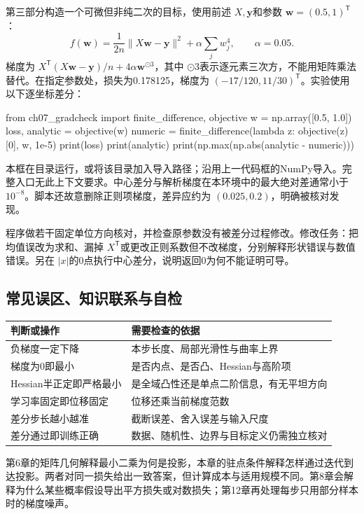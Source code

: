 \documentclass[UTF8,fontset=none,zihao=-4,a4paper]{ctexart}
\newcommand{\code}[1]{\texttt{\detokenize{#1}}}
\numberwithin{equation}{section}
\numberwithin{figure}{section}
\begin{document}
第三部分构造一个可微但非纯二次的目标，使用前述 $X,\symbf y$和参数 $\symbf w=(0.5,1)^{\mathsf T}$：
\[
 f(\symbf w)=\frac1{2n}\|X\symbf w-\symbf y\|^2+\alpha\sum_jw_j^4,
 \qquad \alpha=0.05.
\]
梯度为 $X^{\mathsf T}(X\symbf w-\symbf y)/n+4\alpha\symbf w^{\odot3}$，其中 $\odot3$表示逐元素三次方，不能用矩阵乘法替代。在指定参数处，损失为0.178125，梯度为 $(-17/120,11/30)^{\mathsf T}$。实验使用以下逐坐标差分：
\begin{pycode}
from ch07_gradcheck import finite_difference, objective
w = np.array([0.5, 1.0])
loss, analytic = objective(w)
numeric = finite_difference(lambda z: objective(z)[0], w, 1e-5)
print(loss)
print(analytic)
print(np.max(np.abs(analytic - numeric)))
\end{pycode}
本框在\code{配套实验}目录运行，或将该目录加入导入路径；\code{np}沿用上一代码框的NumPy导入。完整入口无此上下文要求。中心差分与解析梯度在本环境中的最大绝对差通常小于 $10^{-8}$。脚本还故意删除正则项梯度，差异应约为 $(0.025,0.2)$，明确被核对发现。

程序做若干固定单位方向核对，并检查原参数没有被差分过程修改。修改任务：把均值误改为求和、漏掉 $X^{\mathsf T}$或更改正则系数但不改梯度，分别解释形状错误与数值错误。另在 $|x|$的0点执行中心差分，说明返回0为何不能证明可导。

\subsection{常见误区、知识联系与自检}
\begin{center}
\begin{tabularx}{\linewidth}{Y Y}
\toprule
判断或操作 & 需要检查的依据\\\midrule
负梯度一定下降 & 本步长度、局部光滑性与曲率上界\\
梯度为0即最小 & 是否内点、是否凸、Hessian与高阶项\\
Hessian半正定即严格最小 & 是全域凸性还是单点二阶信息，有无平坦方向\\
学习率固定即位移固定 & 位移还乘当前梯度范数\\
差分步长越小越准 & 截断误差、舍入误差与输入尺度\\
差分通过即训练正确 & 数据、随机性、边界与目标定义仍需独立核对\\\bottomrule
\end{tabularx}
\end{center}
第6章的矩阵几何解释最小二乘为何是投影，本章的驻点条件解释怎样通过迭代到达投影。两者对同一损失给出一致答案，但计算成本与适用规模不同。第8章会解释为什么某些概率假设导出平方损失或对数损失；第12章再处理每步只用部分样本时的梯度噪声。
\end{document}
